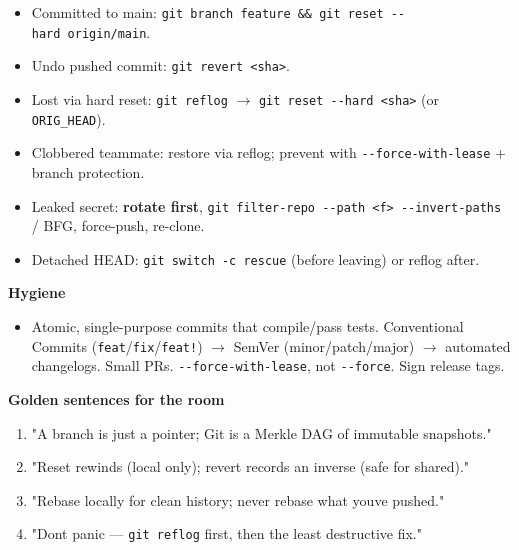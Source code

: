\documentclass[11pt]{article}
\providecommand{\tightlist}{\setlength{\itemsep}{1pt}\setlength{\parskip}{0pt}}
\begin{document}
\begin{itemize}
\tightlist
\item
  Committed to main: \texttt{git\ branch\ feature\ \&\&\ git\ reset\ -\/-hard\ origin/main}.
\item
  Undo pushed commit: \texttt{git\ revert\ \textless{}sha\textgreater{}}.
\item
  Lost via hard reset: \texttt{git\ reflog} \(\rightarrow\) \texttt{git\ reset\ -\/-hard\ \textless{}sha\textgreater{}} (or \texttt{ORIG\_HEAD}).
\item
  Clobbered teammate: restore via reflog; prevent with \texttt{-\/-force-with-lease} + branch protection.
\item
  Leaked secret: \textbf{rotate first}, \texttt{git\ filter-repo\ -\/-path\ \textless{}f\textgreater{}\ -\/-invert-paths} / BFG, force-push, re-clone.
\item
  Detached HEAD: \texttt{git\ switch\ -c\ rescue} (before leaving) or reflog after.
\end{itemize}

\textbf{Hygiene}

\begin{itemize}
\tightlist
\item
  Atomic, single-purpose commits that compile/pass tests. Conventional Commits (\texttt{feat}/\texttt{fix}/\texttt{feat!}) \(\rightarrow\) SemVer (minor/patch/major) \(\rightarrow\) automated changelogs. Small PRs. \texttt{-\/-force-with-lease}, not \texttt{-\/-force}. Sign release tags.
\end{itemize}

\textbf{Golden sentences for the room}

\begin{enumerate}
\def\labelenumi{\arabic{enumi}.}
\tightlist
\item
  "A branch is just a pointer; Git is a Merkle DAG of immutable snapshots."
\item
  "Reset rewinds (local only); revert records an inverse (safe for shared)."
\item
  "Rebase locally for clean history; never rebase what you\textquotesingle ve pushed."
\item
  "Don\textquotesingle t panic --- \texttt{git\ reflog} first, then the least destructive fix."
\end{enumerate}
\end{document}
